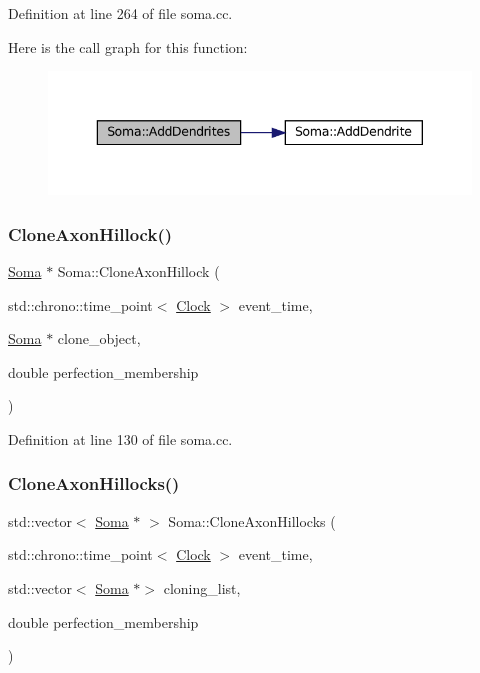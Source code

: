 Definition at line 264 of file soma.\+cc.

Here is the call graph for this function\+:\nopagebreak
\begin{figure}[H]
\begin{center}
\leavevmode
\includegraphics[width=343pt]{class_soma_a9874f03b33413b06ca74a3143cc35331_cgraph}
\end{center}
\end{figure}
\mbox{\label{class_soma_a31463fba2f535e9c7cb05c8622fe3562}} 
\subsubsection{\texorpdfstring{Clone\+Axon\+Hillock()}{CloneAxonHillock()}}
{\footnotesize\ttfamily \mbox{\hyperlink{class_soma}{Soma}} $\ast$ Soma\+::\+Clone\+Axon\+Hillock (\begin{DoxyParamCaption}\item[{std\+::chrono\+::time\+\_\+point$<$ \mbox{\hyperlink{universe_8h_a0ef8d951d1ca5ab3cfaf7ab4c7a6fd80}{Clock}} $>$}]{event\+\_\+time,  }\item[{\mbox{\hyperlink{class_soma}{Soma}} $\ast$}]{clone\+\_\+object,  }\item[{double}]{perfection\+\_\+membership }\end{DoxyParamCaption})}



Definition at line 130 of file soma.\+cc.

\mbox{\label{class_soma_a299c95b89f50576244d1e56f531a80be}} 
\subsubsection{\texorpdfstring{Clone\+Axon\+Hillocks()}{CloneAxonHillocks()}}
{\footnotesize\ttfamily std\+::vector$<$ \mbox{\hyperlink{class_soma}{Soma}} $\ast$ $>$ Soma\+::\+Clone\+Axon\+Hillocks (\begin{DoxyParamCaption}\item[{std\+::chrono\+::time\+\_\+point$<$ \mbox{\hyperlink{universe_8h_a0ef8d951d1ca5ab3cfaf7ab4c7a6fd80}{Clock}} $>$}]{event\+\_\+time,  }\item[{std\+::vector$<$ \mbox{\hyperlink{class_soma}{Soma}} $\ast$$>$}]{cloning\+\_\+list,  }\item[{double}]{perfection\+\_\+membership }\end{DoxyParamCaption})}



